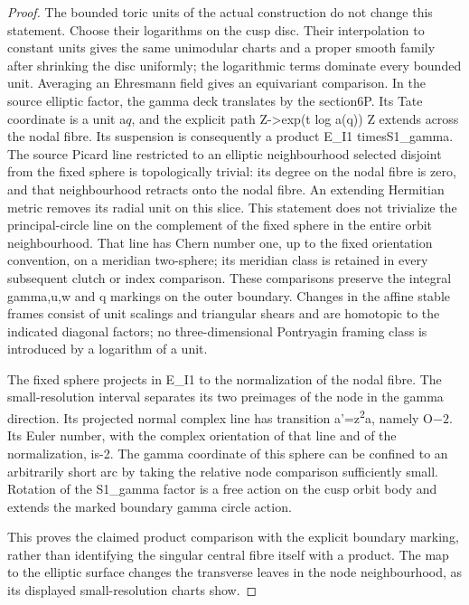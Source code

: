 \begin{proof}
The bounded toric units of the actual construction do not change this statement. Choose their logarithms on the cusp disc. Their interpolation to constant units gives the same unimodular charts and a proper smooth family after shrinking the disc uniformly; the logarithmic terms dominate every bounded unit. Averaging an Ehresmann field gives an equivariant comparison. In the source elliptic factor, the gamma deck translates by the section6P. Its Tate coordinate is a unit a\(q\), and the explicit path Z-\textgreater exp(t log a(q)) Z extends across the nodal fibre. Its suspension is consequently a product E\_I1 timesS1\_gamma. The source Picard line restricted to an elliptic neighbourhood selected disjoint from the fixed sphere is topologically trivial: its degree on the nodal fibre is zero, and that neighbourhood retracts onto the nodal fibre. An extending Hermitian metric removes its radial unit on this slice. This statement does not trivialize the principal-circle line on the complement of the fixed sphere in the entire orbit neighbourhood. That line has Chern number one, up to the fixed orientation convention, on a meridian two-sphere; its meridian class is retained in every subsequent clutch or index comparison. These comparisons preserve the integral gamma,u,w and q markings on the outer boundary. Changes in the affine stable frames consist of unit scalings and triangular shears and are homotopic to the indicated diagonal factors; no three-dimensional Pontryagin framing class is introduced by a logarithm of a unit.

The fixed sphere projects in E\_I1 to the normalization of the nodal fibre. The small-resolution interval separates its two preimages of the node in the gamma direction. Its projected normal complex line has transition a'=z\textsuperscript{2}a, namely O\(-2\). Its Euler number, with the complex orientation of that line and of the normalization, is-2. The gamma coordinate of this sphere can be confined to an arbitrarily short arc by taking the relative node comparison sufficiently small. Rotation of the S1\_gamma factor is a free action on the cusp orbit body and extends the marked boundary gamma circle action.

This proves the claimed product comparison with the explicit boundary marking, rather than identifying the singular central fibre itself with a product. The map to the elliptic surface changes the transverse leaves in the node neighbourhood, as its displayed small-resolution charts show.
\end{proof}
